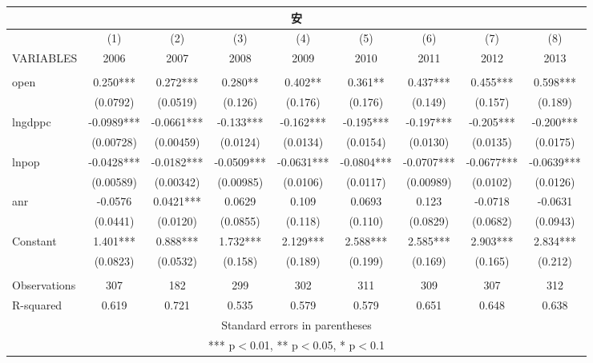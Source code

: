 \documentclass[]{article}
\begin{document}
\begin{tabular}{lcccccccc}
\multicolumn{9}{c}{安} \\ \hline
 & (1) & (2) & (3) & (4) & (5) & (6) & (7) & (8) \\
VARIABLES & 2006 & 2007 & 2008 & 2009 & 2010 & 2011 & 2012 & 2013 \\ \hline
 &  &  &  &  &  &  &  &  \\
open & 0.250*** & 0.272*** & 0.280** & 0.402** & 0.361** & 0.437*** & 0.455*** & 0.598*** \\
 & (0.0792) & (0.0519) & (0.126) & (0.176) & (0.176) & (0.149) & (0.157) & (0.189) \\
lngdppc & -0.0989*** & -0.0661*** & -0.133*** & -0.162*** & -0.195*** & -0.197*** & -0.205*** & -0.200*** \\
 & (0.00728) & (0.00459) & (0.0124) & (0.0134) & (0.0154) & (0.0130) & (0.0135) & (0.0175) \\
lnpop & -0.0428*** & -0.0182*** & -0.0509*** & -0.0631*** & -0.0804*** & -0.0707*** & -0.0677*** & -0.0639*** \\
 & (0.00589) & (0.00342) & (0.00985) & (0.0106) & (0.0117) & (0.00989) & (0.0102) & (0.0126) \\
anr & -0.0576 & 0.0421*** & 0.0629 & 0.109 & 0.0693 & 0.123 & -0.0718 & -0.0631 \\
 & (0.0441) & (0.0120) & (0.0855) & (0.118) & (0.110) & (0.0829) & (0.0682) & (0.0943) \\
Constant & 1.401*** & 0.888*** & 1.732*** & 2.129*** & 2.588*** & 2.585*** & 2.903*** & 2.834*** \\
 & (0.0823) & (0.0532) & (0.158) & (0.189) & (0.199) & (0.169) & (0.165) & (0.212) \\
 &  &  &  &  &  &  &  &  \\
Observations & 307 & 182 & 299 & 302 & 311 & 309 & 307 & 312 \\
 R-squared & 0.619 & 0.721 & 0.535 & 0.579 & 0.579 & 0.651 & 0.648 & 0.638 \\ \hline
\multicolumn{9}{c}{ Standard errors in parentheses} \\
\multicolumn{9}{c}{ *** p$<$0.01, ** p$<$0.05, * p$<$0.1} \\
\end{tabular}
\end{document}
